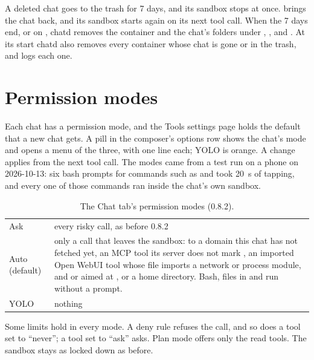 A deleted chat goes to the trash for 7 days, and its sandbox stops at once.  brings the chat back, and its sandbox starts again on its next tool call. When the 7 days end, or on , chatd removes the container and the chat's folders under , ,  and . At its start chatd also removes every container whose chat is gone or in the trash, and logs each one.

\section{Permission modes}\label{sec:chat-modes}

Each chat has a permission mode, and the Tools settings page holds the default that a new chat gets. A pill in the composer's options row shows the chat's mode and opens a menu of the three, with one line each; YOLO is orange. A change applies from the next tool call. The modes came from a test run on a phone on 2026-10-13: six bash prompts for commands such as  and  took 20~s of tapping, and every one of those commands ran inside the chat's own sandbox.

\begin{table}[htbp]
\centering\small
\caption{The Chat tab's permission modes (0.8.2).}\label{tab:chat-modes}
\begin{tabularx}{\linewidth}{@{}L{.16\linewidth}Y@{}}
\toprule
{} &  \\
\midrule
Ask & every risky call, as before 0.8.2 \\
Auto (default) & only a call that leaves the sandbox:  to a domain this chat has not fetched yet, an MCP tool its server does not mark , an imported Open WebUI tool whose file imports a network or process module, and  or  aimed at \code{/},  or a home directory. Bash, files in  and  run without a prompt. \\
YOLO & nothing \\
\bottomrule
\end{tabularx}
\end{table}

Some limits hold in every mode. A deny rule refuses the call, and so does a tool set to \enquote{never}; a tool set to \enquote{ask} asks. Plan mode offers only the read tools. The sandbox stays as locked down as before.

